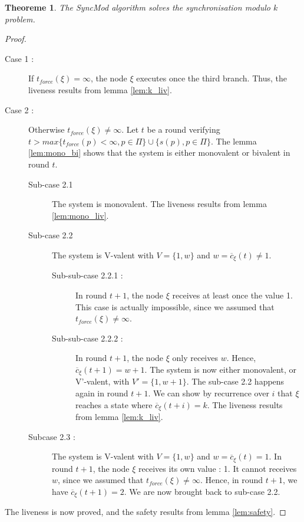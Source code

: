 \documentclass{article}
\newtheorem{theorem}{Theoreme}
\begin{document}
\begin{theorem}
	The SyncMod algorithm solves the synchronisation modulo $k$ problem.
\end{theorem}
\begin{proof}
	\begin{description}
		\item[Case 1 : ] If $t_{force}(\xi) = \infty$, the node $\xi$ executes once the third branch.
			Thus, the liveness results from lemma \ref{lem:k_liv}.

		\item[Case 2 :] Otherwise $t_{force}(\xi) \neq \infty$.
			Let $t$ be a round verifying $t > max \{t_{force}(p) < \infty, p \in \Pi\} \cup \{s(p), p \in \Pi\}$.
			The lemma \ref{lem:mono_bi} shows that the system is either monovalent or bivalent in round $t$.
			\begin{description}
				\item[Sub-case 2.1] The system is monovalent. The liveness results from lemma \ref{lem:mono_liv}.
				\item[Sub-case 2.2] The system is V-valent with $V = \{1, w\}$ and $w = \overline{c}_\xi(t) \neq 1$.
					\begin{description}
						\item[Sub-sub-case 2.2.1 : ] In round $t+1$, the node $\xi$ receives at least once
							the value 1.
							This case is actually impossible, since we assumed that $t_{force}(\xi) \neq \infty$.
						\item[Sub-sub-case 2.2.2 : ] In round $t+1$, the node $\xi$ only receives $w$.
							Hence, $\overline{c}_\xi(t+1) = w+1$. The system is now either monovalent,
							or V'-valent, with $V' = \{1, w+1\}$.
							The sub-case 2.2 happens again in round $t+1$.
							We can show by recurrence over $i$ that $\xi$ reaches a state where $\overline{c}_\xi(t+i) = k$.
							The liveness results from lemma \ref{lem:k_liv}.
					\end{description}
				\item[Subcase 2.3 : ] The system is V-valent with $V = \{1, w\}$ and $w = \overline{c}_\xi(t) = 1$.
					In round $t+1$, the node $\xi$ receives its own value : 1.
					It cannot receives $w$, since we assumed that $t_{force}(\xi) \neq \infty$.
					Hence, in round $t+1$, we have $\overline{c}_\xi(t+1) = 2$.
					We are now brought back to sub-case 2.2.
			\end{description}
	\end{description}
	The liveness is now proved, and the safety results from lemma \ref{lem:safety}.
\end{proof}
\end{document}

